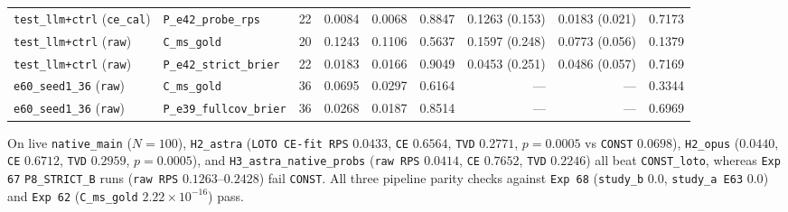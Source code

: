 {\begin{tabular}{@{}l l r r r r r r r@{}}
\texttt{test\_llm+ctrl} (\texttt{ce\_cal}) & \texttt{P\_e42\_probe\_rps} & 22 & 0.0084 & 0.0068 & 0.8847 & 0.1263 (0.153) & 0.0183 (0.021) & 0.7173 \\
\texttt{test\_llm+ctrl} (\texttt{raw}) & \texttt{C\_ms\_gold} & 20 & 0.1243 & 0.1106 & 0.5637 & 0.1597 (0.248) & 0.0773 (0.056) & 0.1379 \\
\texttt{test\_llm+ctrl} (\texttt{raw}) & \texttt{P\_e42\_strict\_brier} & 22 & 0.0183 & 0.0166 & 0.9049 & 0.0453 (0.251) & 0.0486 (0.057) & 0.7169 \\
\texttt{e60\_seed1\_36} (\texttt{raw}) & \texttt{C\_ms\_gold} & 36 & 0.0695 & 0.0297 & 0.6164 & {---} & {---} & 0.3344 \\
\texttt{e60\_seed1\_36} (\texttt{raw}) & \texttt{P\_e39\_fullcov\_brier} & 36 & 0.0268 & 0.0187 & 0.8514 & {---} & {---} & 0.6969 \\
\bottomrule
\end{tabular}}

On live \texttt{native\_main} ($N=100$), \texttt{H2\_astra} (\texttt{LOTO CE-fit RPS} $0.0433$, \texttt{CE} $0.6564$, \texttt{TVD} $0.2771$, $p=0.0005$ vs \texttt{CONST} $0.0698$), \texttt{H2\_opus} ($0.0440$, \texttt{CE} $0.6712$, \texttt{TVD} $0.2959$, $p=0.0005$), and \texttt{H3\_astra\_native\_probs} (\texttt{raw RPS} $0.0414$, \texttt{CE} $0.7652$, \texttt{TVD} $0.2246$) all beat \texttt{CONST\_loto}, whereas \texttt{Exp 67} \texttt{P8\_STRICT\_B} runs (\texttt{raw RPS} $0.1263$--$0.2428$) fail \texttt{CONST}. All three pipeline parity checks against \texttt{Exp 68} (\texttt{study\_b} $0.0$, \texttt{study\_a E63} $0.0$) and \texttt{Exp 62} (\texttt{C\_ms\_gold} $2.22 \times 10^{-16}$) pass.


